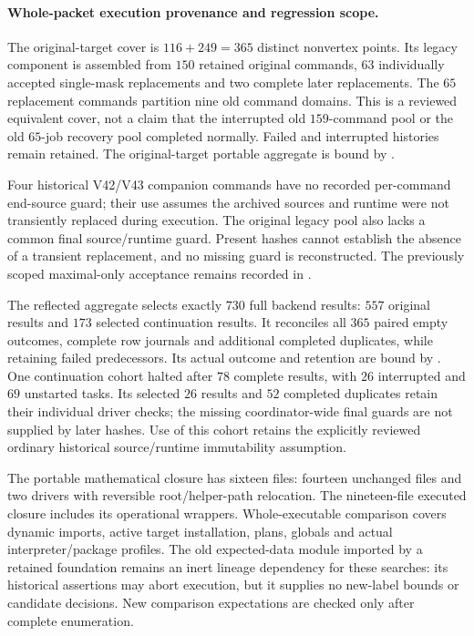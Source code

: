 \paragraph{Whole-packet execution provenance and regression scope.}
The original-target cover is $116+249=365$ distinct nonvertex points.
Its legacy component is assembled from $150$ retained original commands,
$63$ individually accepted single-mask replacements and two complete
later replacements. The $65$ replacement commands partition nine old
command domains. This is a reviewed equivalent cover, not a claim that
the interrupted old $159$-command pool or the old $65$-job recovery pool
completed normally. Failed and interrupted histories remain retained.
The original-target portable aggregate is bound by
.

Four historical V42/V43 companion commands have no recorded per-command
end-source guard; their use assumes the archived sources and runtime
were not transiently replaced during execution. The original legacy
pool also lacks a common final source/runtime guard. Present hashes
cannot establish the absence of a transient replacement, and no missing
guard is reconstructed. The previously scoped maximal-only acceptance
remains recorded in
.

The reflected aggregate selects exactly $730$ full backend results:
$557$ original results and $173$ selected continuation results. It
reconciles all $365$ paired empty outcomes, complete row journals and
additional completed duplicates, while retaining failed predecessors.
Its actual outcome and retention are bound by
.
One continuation cohort halted after $78$ complete results, with
$26$ interrupted and $69$ unstarted tasks. Its selected $26$ results
and $52$ completed duplicates retain their individual driver checks;
the missing coordinator-wide final guards are not supplied by later
hashes. Use of this cohort retains the explicitly reviewed ordinary
historical source/runtime immutability assumption.

The portable mathematical closure has sixteen files: fourteen unchanged
files and two drivers with reversible root/helper-path relocation.
The nineteen-file executed closure includes its operational wrappers.
Whole-executable comparison covers dynamic imports, active target
installation, plans, globals and actual interpreter/package profiles.
The old expected-data module imported by a retained foundation remains
an inert lineage dependency for these searches: its historical
assertions may abort execution, but it supplies no new-label bounds or
candidate decisions. New comparison expectations are checked only after
complete enumeration.

